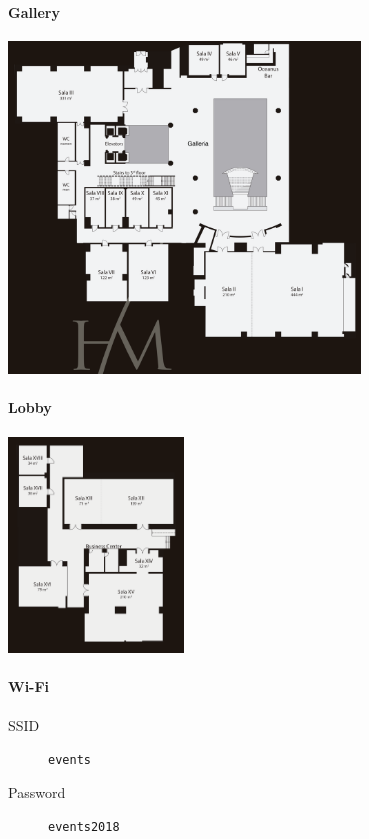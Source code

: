 \label{Floorplan}

\paragraph{Gallery}
\begin{center}
  \includegraphics[width=0.7\textwidth]{img/gallery}
\end{center}

\paragraph{Lobby}
\begin{center}
  \includegraphics[width=0.35\textwidth]{img/lobby}
\end{center}

\vfil
\paragraph{Wi-Fi}
\begin{description}
\item[SSID] \texttt{events}
\item[Password] \texttt{events2018}
\end{description}
\vfil
\eject

\newpage

